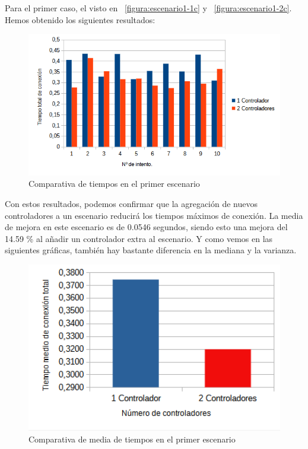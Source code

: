 \documentclass[a4paper, 12pt]{book}
\begin{document}
 		Para el primer caso, el visto en ~\ref{figura:escenario1-1c} y ~\ref{figura:escenario1-2c}. Hemos obtenido los siguientes resultados:
 	
 	\begin{figure}[H]
 		\centering
 		\includegraphics[width=16cm, keepaspectratio]{img/comparativabucle4}
 		\caption{Comparativa de tiempos en el primer escenario}
 		\label{figura:comparativabucle4}
 	\end{figure}
 	
	Con estos resultados, podemos confirmar que la agregación de nuevos controladores a un escenario reducirá los tiempos máximos de conexión. La media de mejora en este escenario es de 0.0546 segundos, siendo esto una mejora del 14.59 \% al añadir un controlador extra al escenario.
	Y como vemos en las siguientes gráficas, también hay bastante diferencia en la mediana y la varianza.
 	
 	\begin{figure}[H]
 		\centering
 		\includegraphics[width=12cm, keepaspectratio]{img/comparativamediasbucle}
 		\caption{Comparativa de media de tiempos en el primer escenario}
 		\label{figura:mediabucle4}
 	\end{figure}
 	
\end{document}
